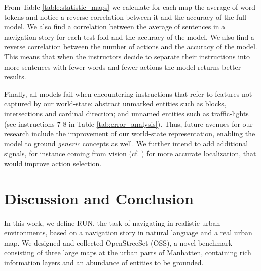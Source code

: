 \documentclass[11pt,a4paper]{article}
\begin{document}
From Table \ref{table:statistic_maps} we calculate for each map the average of word tokens and notice a reverse correlation between it and the accuracy of the full model. We also find a correlation between the average of sentences in a navigation story for each test-fold and the accuracy of the model. We also find a reverse correlation between the number of actions and the accuracy of the model. This means that when the instructors decide to separate their instructions into more sentences with fewer words and fewer actions the model returns better results. \par


Finally, all models fail when encountering  instructions that refer to features not captured by our world-state: abstract unmarked entities  such as blocks, intersections and cardinal direction; and unnamed entities such as traffic-lights (see instructions 7-8 in Table \ref{tab:error_analysis}). Thus, future avenues for our research include the improvement of our world-state representation, enabling the model to ground  {\em generic} concepts as well. We further intend to add additional signals, for instance coming from vision
(cf. ) for more accurate localization, that would improve action selection. 

 
\section{Discussion and Conclusion}
\label{conclusion}


In this work, we define RUN,  the task of navigating in  realistic urban environments, based on a navigation story in natural language and a real urban map.
%
We designed and collected  OpenStreeSet (OSS), a novel benchmark consisting of three large maps at the urban parts of Manhatten, containing rich information layers and an abundance of entities to be grounded.
\end{document}
